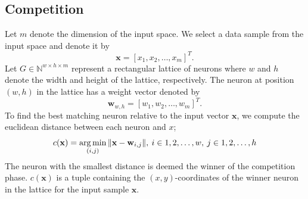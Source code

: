 \documentclass[english]{lni}
\newcommand{\argmin}{\operatornamewithlimits{arg\,min}}
\begin{document}
\subsection{Competition}
Let $m$ denote the dimension of the input space.
We select a data sample from the input space and denote it by
\begin{equation}
    \mathbf{x} = [x_{1}, x_{2}, \hdots, x_{m}]^{T}.
\end{equation}
Let $G \in \mathbb{N}^{w \times h \times m}$ represent a rectangular lattice of neurons where $w$ and $h$ denote the width and height of the lattice, respectively.
The neuron at position $(w, h)$ in the lattice has a weight vector denoted by 
\begin{equation}
    \mathbf{w}_{w, h} = [w_{1}, w_{2}, \hdots, w_{m}]^{T}.
\end{equation}
To find the best matching neuron relative to the input vector $\mathbf{x}$, we 
compute the euclidean distance between each neuron and $x$;
\begin{equation}
    c(\mathbf{x}) = \argmin_{(i, j)}{\| \mathbf{x} - \mathbf{w}_{i, j}\|},  \:
    i \in {1, 2, \hdots, w},  \:
    j \in {1, 2, \hdots, h}
\end{equation}
The neuron with the smallest
distance is deemed the winner of the competition phase. 
${c(\mathbf{x})}$ is a tuple containing the $(x,y)$-coordinates of the winner 
neuron in the lattice for the input sample $\mathbf{x}$. 
\end{document}
